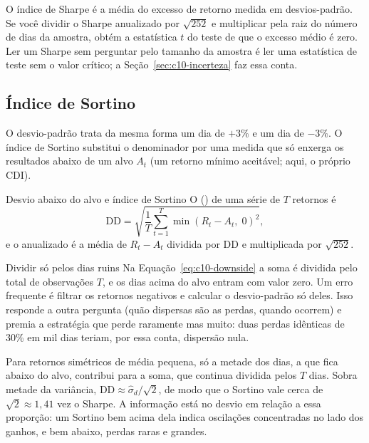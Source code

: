 \begin{intuicao}
O índice de Sharpe é a média do excesso de retorno medida em desvios-padrão. Se você dividir o Sharpe anualizado por $\sqrt{252}$ e multiplicar pela raiz do número de dias da amostra, obtém a estatística $t$ do teste de que o excesso médio é zero. Ler um Sharpe sem perguntar pelo tamanho da amostra é ler uma estatística de teste sem o valor crítico; a Seção~\ref{sec:c10-incerteza} faz essa conta.
\end{intuicao}

\subsection{Índice de Sortino}

O desvio-padrão trata da mesma forma um dia de $+3\%$ e um dia de $-3\%$. O índice de Sortino \citep{sortino1994} substitui o denominador por uma medida que só enxerga os resultados abaixo de um alvo $A_t$ (um retorno mínimo aceitável; aqui, o próprio CDI).

\begin{definicao}{Desvio abaixo do alvo e índice de Sortino}
O  () de uma série de $T$ retornos é
\begin{equation}
  \text{DD} = \sqrt{\frac{1}{T}\sum_{t=1}^{T} \min(R_t - A_t,\; 0)^2} ,
  \label{eq:c10-downside}
\end{equation}
e o  anualizado é a média de $R_t - A_t$ dividida por DD e multiplicada por $\sqrt{252}$.
\end{definicao}

\begin{armadilha}{Dividir só pelos dias ruins}
Na Equação~\eqref{eq:c10-downside} a soma é dividida pelo total de observações $T$, e os dias acima do alvo entram com valor zero. Um erro frequente é filtrar os retornos negativos e calcular o desvio-padrão só deles. Isso responde a outra pergunta (quão dispersas são as perdas, quando ocorrem) e premia a estratégia que perde raramente mas muito: duas perdas idênticas de 30\% em mil dias teriam, por essa conta, dispersão nula.
\end{armadilha}

Para retornos simétricos de média pequena, só a metade dos dias, a que fica abaixo do alvo, contribui para a soma, que continua dividida pelos $T$ dias. Sobra metade da variância, $\text{DD} \approx \hat\sigma_d/\sqrt{2}$, de modo que o Sortino vale cerca de $\sqrt{2} \approx 1,41$ vez o Sharpe. A informação está no desvio em relação a essa proporção: um Sortino bem acima dela indica oscilações concentradas no lado dos ganhos, e bem abaixo, perdas raras e grandes.

